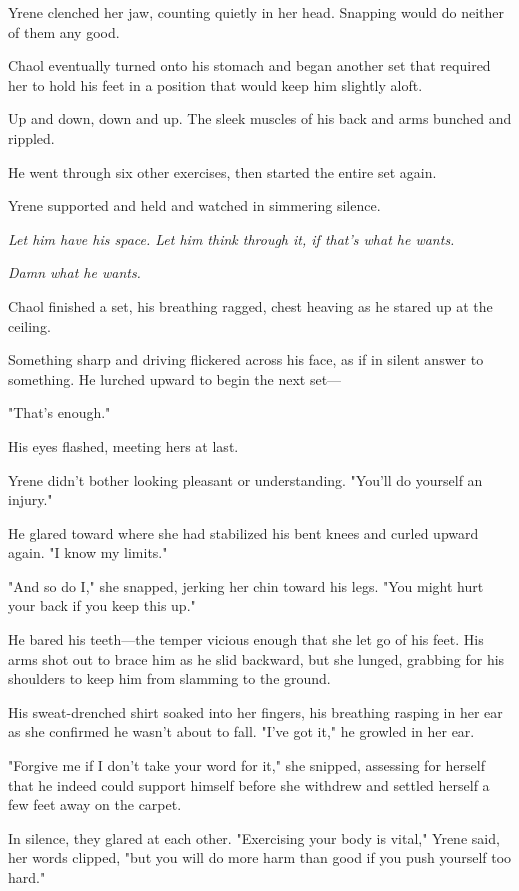 Yrene clenched her jaw, counting quietly in her head. Snapping would do neither of them any good.

Chaol eventually turned onto his stomach and began another set that required her to hold his feet in a position that would keep him slightly aloft.

Up and down, down and up. The sleek muscles of his back and arms bunched and rippled.

He went through six other exercises, then started the entire set again.

Yrene supported and held and watched in simmering silence.

\emph{Let him have his space. Let him think through it, if that's what he wants.}

\emph{Damn what he wants.}

Chaol finished a set, his breathing ragged, chest heaving as he stared up at the ceiling.

Something sharp and driving flickered across his face, as if in silent answer to something. He lurched upward to begin the next set---

"That's enough."

His eyes flashed, meeting hers at last.

Yrene didn't bother looking pleasant or understanding. "You'll do yourself an injury."

He glared toward where she had stabilized his bent knees and curled upward again. "I know my limits."

"And so do I," she snapped, jerking her chin toward his legs. "You might hurt your back if you keep this up."

He bared his teeth---the temper vicious enough that she let go of his feet. His arms shot out to brace him as he slid backward, but she lunged, grabbing for his shoulders to keep him from slamming to the ground.

His sweat-drenched shirt soaked into her fingers, his breathing rasping in her ear as she confirmed he wasn't about to fall. "I've got it," he growled in her ear.

"Forgive me if I don't take your word for it," she snipped, assessing for herself that he indeed could support himself before she withdrew and settled herself a few feet away on the carpet.

In silence, they glared at each other. "Exercising your body is vital," Yrene said, her words clipped, "but you will do more harm than good if you push yourself too hard."


